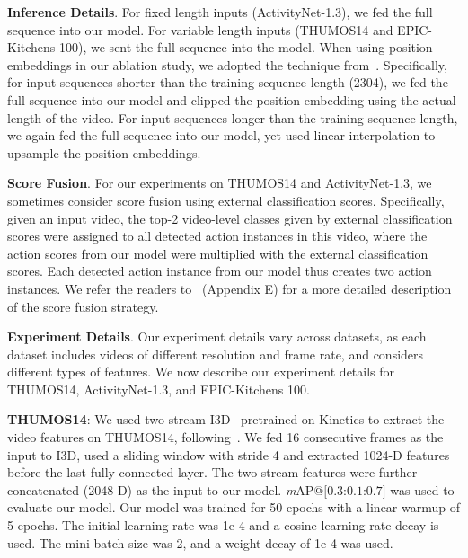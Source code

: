 \medskip
\noindent \textbf{Inference Details}. For fixed length inputs (ActivityNet-1.3), we fed the full sequence into our model. For variable length inputs (THUMOS14 and EPIC-Kitchens 100), we sent the full sequence into the model. When using position embeddings in our ablation study, we adopted the technique from~\cite{vitarxiv2020}. Specifically, for input sequences shorter than the training sequence length (2304), we fed the full sequence into our model and clipped the position embedding using the actual length of the video. For input sequences longer than the training sequence length, we again fed the full sequence into our model, yet used linear interpolation to upsample the position embeddings.

\medskip
\noindent \textbf{Score Fusion}. For our experiments on THUMOS14 and ActivityNet-1.3, we sometimes consider score fusion using external classification scores. Specifically, given an input video, the top-2 video-level classes given by external classification scores were assigned to all detected action instances in this video, where the action scores from our model were multiplied with the external classification scores. Each detected action instance from our model thus creates two action instances. We refer the readers to~\cite{pgcniccv2019} (Appendix E) for a more detailed description of the score fusion strategy. 



\medskip
\noindent \textbf{Experiment Details}.
Our experiment details vary across datasets, as each dataset includes videos of different resolution and frame rate, and considers different types of features. We now describe our experiment details for THUMOS14, ActivityNet-1.3, and EPIC-Kitchens 100.\smallskip

\squishlist
\item \textbf{THUMOS14}: We used two-stream I3D~\cite{kinetics2017cvpr} pretrained on Kinetics to extract the video features on THUMOS14, following~\cite{cmcscvpr2019,bottumuptaleccv2020}. We fed 16 consecutive frames as the input to I3D, used a sliding window with stride 4 and extracted 1024-D features before the last fully connected layer. The two-stream features were further concatenated (2048-D) as the input to our model. \textit{m}AP@$[0.3$:$0.1$:$0.7]$ was used to evaluate our model. Our model was trained for 50 epochs with a linear warmup of 5 epochs. The initial learning rate was 1e-4 and a cosine learning rate decay is used. The mini-batch size was 2, and a weight decay of 1e-4 was used.

